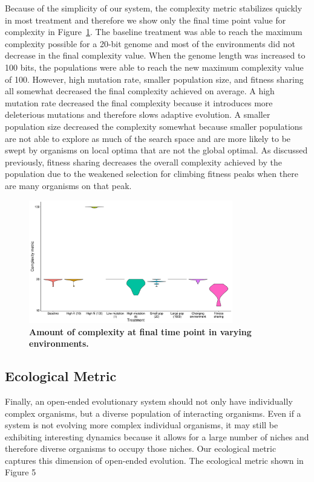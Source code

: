 \documentclass[letterpaper]{article}
\begin{document}
Because of the simplicity of our system, the complexity metric stabilizes quickly in most treatment and therefore we show only the final time point value for complexity in Figure~\ref{complexity}. The baseline treatment was able to reach the maximum complexity possible for a 20-bit genome and most of the environments did not decrease in the final complexity value. When the genome length was increased to 100 bits, the populations were able to reach the new maximum complexity value of 100. However, high mutation rate, smaller population size, and fitness sharing all somewhat decreased the final complexity achieved on average. A high mutation rate decreased the final complexity because it introduces more deleterious mutations and therefore slows adaptive evolution. A smaller population size decreased the complexity somewhat because smaller populations are not able to explore as much of the search space and are more likely to be swept by organisms on local optima that are not the global optimal. As discussed previously, fitness sharing decreases the overall complexity achieved by the population due to the weakened selection for climbing fitness peaks when there are many organisms on that peak.

\begin{figure}
\includegraphics[width=3.5in]{figs/complexityboxplots.png}
\caption{\textbf{Amount of complexity at final time point in varying environments.} }
\label{complexity}
\end{figure}

\subsection{Ecological Metric}
Finally, an open-ended evolutionary system should not only have individually complex organisms, but a diverse population of interacting organisms. Even if a system is not evolving more complex individual organisms, it may still be exhibiting interesting dynamics because it allows for a large number of niches and therefore diverse organisms to occupy those niches. Our ecological metric captures this dimension of open-ended evolution. The ecological metric shown in Figure 5 
\end{document}
